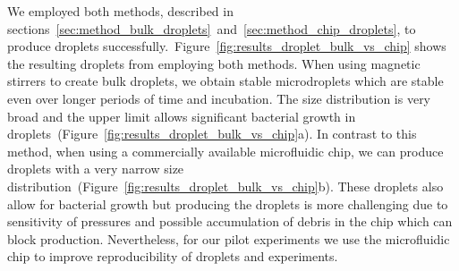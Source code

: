 We employed both methods, described in sections~\ref{sec:method_bulk_droplets}~and~\ref{sec:method_chip_droplets}, to produce droplets successfully.~Figure~\ref{fig:results_droplet_bulk_vs_chip} shows the resulting droplets from employing both methods. When using magnetic stirrers to create bulk droplets, we obtain stable microdroplets which are stable even over longer periods of time and incubation. The size distribution is very broad and the upper limit allows significant bacterial growth in droplets~(Figure~\ref{fig:results_droplet_bulk_vs_chip}a). In contrast to this method, when using a commercially available microfluidic chip, we can produce droplets with a very narrow size distribution~(Figure~\ref{fig:results_droplet_bulk_vs_chip}b). These droplets also allow for bacterial growth but producing the droplets is more challenging due to sensitivity of pressures and possible accumulation of debris in the chip which can block production. Nevertheless, for our pilot experiments we use the microfluidic chip to improve reproducibility of droplets and experiments.

